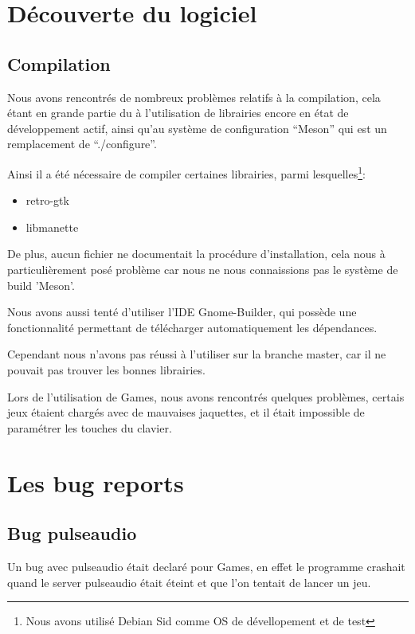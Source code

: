 \documentclass[12pt]{report}
\begin{document}
\section{Découverte du logiciel}
\subsection{Compilation}
Nous avons rencontrés de nombreux problèmes relatifs à la compilation,
cela étant en grande partie du à l'utilisation de librairies encore en
état de développement actif, ainsi qu'au système de configuration
``Meson'' qui est un remplacement de ``./configure''.

Ainsi il a été nécessaire de compiler certaines librairies, parmi
lesquelles\footnote{Nous avons utilisé Debian Sid comme OS de dévellopement et de test}:
\begin{itemize}
\item retro-gtk
\item libmanette
\end{itemize}

De plus, aucun fichier ne documentait la procédure d'installation,
cela nous à particulièrement posé problème car nous ne nous
connaissions pas le système de build 'Meson'.

Nous avons aussi tenté d'utiliser l'IDE Gnome-Builder, qui possède une
fonctionnalité permettant de télécharger automatiquement les
dépendances.

Cependant nous n'avons pas réussi à l'utiliser sur la branche master,
car il ne pouvait pas trouver les bonnes librairies.

Lors de l'utilisation de Games, nous avons rencontrés quelques
problèmes, certais jeux étaient chargés avec de mauvaises jaquettes,
et il était impossible de paramétrer les touches du clavier.

\section{Les bug reports}
\subsection{Bug pulseaudio}
Un bug avec pulseaudio était declaré pour Games, en effet le programme crashait
quand le server pulseaudio était éteint et que l'on tentait de lancer
un jeu.
\end{document}
